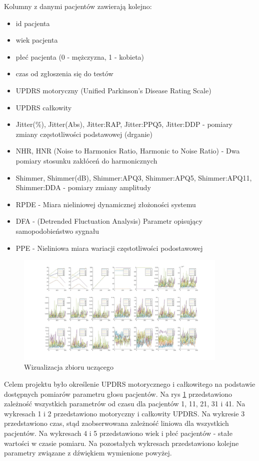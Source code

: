 \documentclass[12pt]{article}
\begin{document}
Kolumny z danymi pacjentów zawierają kolejno:
\begin{itemize}
	\item id pacjenta
	\item wiek pacjenta
	\item płeć pacjenta (0 - mężczyzna, 1 - kobieta)
	\item czas od zgłoszenia się do testów
	\item UPDRS motoryczny (Unified Parkinson's Disease Rating Scale)
	\item UPDRS całkowity
	\item Jitter(\%), Jitter(Abs), Jitter:RAP, Jitter:PPQ5, Jitter:DDP - pomiary zmiany częstotliwości podstawowej (drganie)
	\item NHR, HNR (Noise to Harmonics Ratio, Harmonic to Noise Ratio) -  Dwa pomiary stosunku zakłóceń do harmonicznych
	\item Shimmer, Shimmer(dB), Shimmer:APQ3, Shimmer:APQ5, Shimmer:APQ11, Shimmer:DDA - pomiary zmiany amplitudy
	\item RPDE - Miara nieliniowej dynamicznej złożoności systemu
	\item DFA - (Detrended Fluctuation Analysis) Parametr opisujący samopodobieństwo sygnału
	\item PPE - Nieliniowa miara wariacji częstotliwości podostawowej
\end{itemize}

\begin{figure}
	\includegraphics[width=0.90\textwidth]{data.jpg}\par\vspace{1cm}
\caption{Wizualizacja zbioru uczącego}
\label{data visualisation}
\end{figure}

Celem projektu było określenie UPDRS motorycznego i całkowitego na podstawie dostępnych pomiarów parametru głosu pacjentów. Na rys \ref{data visualisation} przedstawiono zależność wszystkich parametrów od czasu dla pacjentów 1, 11, 21, 31 i 41. Na wykresach 1 i 2 przedstawiono motoryczny i całkowity UPDRS. Na wykresie 3 przedstawiono czas, stąd zaobserwowana zależność liniowa dla wszystkich pacjentów. Na wykresach 4 i 5 przedstawiono wiek i płeć pacjentów - stałe wartości w czasie pomiaru. Na pozostałych wykresach przedstawiono kolejne parametry związane z dźwiękiem wymienione powyżej.
\end{document}
